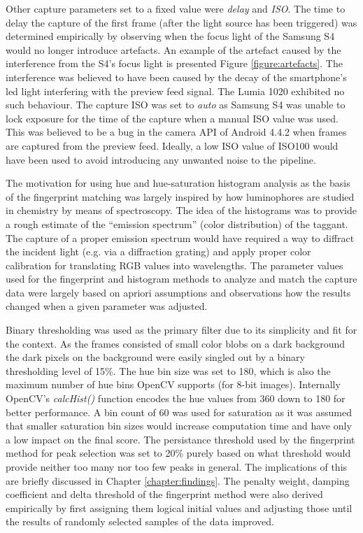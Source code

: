\documentclass[thesis.tex]{subfiles}
\begin{document}
Other capture parameters set to a fixed value were \emph{delay} and \emph{ISO}. The time to delay the capture of the first frame (after the light source has been triggered) was determined empirically by observing when the focus light of the Samsung S4 would no longer introduce artefacts. An example of the artefact caused by the interference from the S4's focus light is presented Figure \ref{figure:artefacts}. The interference was believed to have been caused by the decay of the smartphone's led light interfering with the preview feed signal. The Lumia 1020 exhibited no such behaviour. The capture ISO was set to \emph{auto} as Samsung S4 was unable to lock exposure for the time of the capture when a manual ISO value was used. This was believed to be a bug in the camera API of Android 4.4.2 when frames are captured from the preview feed. Ideally, a low ISO value of ISO100 would have been used to avoid introducing any unwanted noise to the pipeline.

The motivation for using hue and hue-saturation histogram analysis as the basis of the fingerprint matching was largely inspired by how luminophores are studied in chemistry by means of spectroscopy. The idea of the histograms was to provide a rough estimate of the ``emission spectrum'' (color distribution) of the taggant. The capture of a proper emission spectrum would have required a way to diffract the incident light (e.g. via a diffraction grating) and apply proper color calibration for translating RGB values into wavelengths. The parameter values used for the fingerprint and histogram methods to analyze and match the capture data were largely based on apriori assumptions and observations how the results changed when a given parameter was adjusted.

Binary thresholding was used as the primary filter due to its simplicity and fit for the context. As the frames consisted of small color blobs on a dark background the dark pixels on the background were easily singled out by a binary thresholding level of 15\%. The hue bin size was set to 180, which is also the maximum number of hue bins OpenCV supports (for 8-bit images). Internally OpenCV's \emph{calcHist()} function encodes the hue values from 360 down to 180 for better performance. A bin count of 60 was used for saturation as it was assumed that smaller saturation bin sizes would increase computation time and have only a low impact on the final score. The persistance threshold used by the fingerprint method for peak selection was set to 20\% purely based on what threshold would provide neither too many nor too few peaks in general. The implications of this are briefly discussed in Chapter \ref{chapter:findings}. The penalty weight, damping coefficient and delta threshold of the fingerprint method were also derived empirically by first assigning them logical initial values and adjusting those until the results of randomly selected samples of the data improved.
\end{document}
